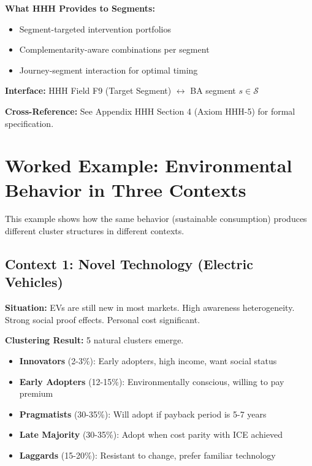 \begin{tcolorbox}[colback=orange!5!white, colframe=orange!75!black,
    title=\textbf{Integration: Segments $\leftrightarrow$ HHH (Intervention Toolkit)}]
\textbf{What HHH Provides to Segments:}
\begin{itemize}[nosep]
\item Segment-targeted intervention portfolios
\item Complementarity-aware combinations per segment
\item Journey-segment interaction for optimal timing
\end{itemize}

\textbf{Interface:} HHH Field F9 (Target Segment) $\leftrightarrow$ BA segment $s \in \mathcal{S}$

\textbf{Cross-Reference:} See Appendix HHH Section 4 (Axiom HHH-5) for formal specification.

\end{tcolorbox}

\section{Worked Example: Environmental Behavior in Three Contexts}
\label{sec:ba-example}

This example shows how the same behavior (sustainable consumption) produces
different cluster structures in different contexts.

\subsection{Context 1: Novel Technology (Electric Vehicles)}

\textbf{Situation:} EVs are still new in most markets. High awareness heterogeneity.
Strong social proof effects. Personal cost significant.

\textbf{Clustering Result:} 5 natural clusters emerge.

\begin{itemize}[nosep]
\item \textbf{Innovators} (2-3\%): Early adopters, high income, want social status
\item \textbf{Early Adopters} (12-15\%): Environmentally conscious, willing to pay premium
\item \textbf{Pragmatists} (30-35\%): Will adopt if payback period is 5-7 years
\item \textbf{Late Majority} (30-35\%): Adopt when cost parity with ICE achieved
\item \textbf{Laggards} (15-20\%): Resistant to change, prefer familiar technology
\end{itemize}

